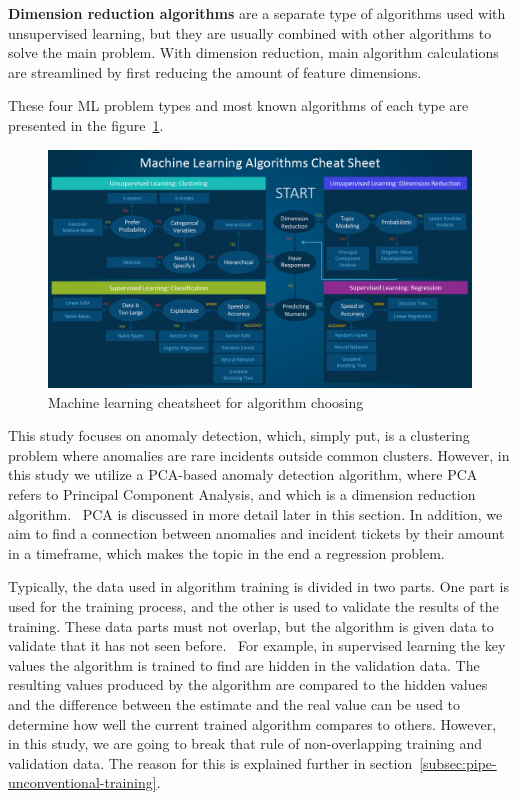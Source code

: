 \textbf{Dimension reduction algorithms} are a separate type of algorithms used with unsupervised learning,
but they are usually combined with other algorithms
to solve the main problem.
With dimension reduction,
main algorithm calculations are streamlined by first reducing the amount of feature dimensions.~\cite{li2017mlalgorithm}

These four ML problem types
and most known algorithms of each type
are presented in the figure~\ref{fig:ml-algorithm-cheatsheet}.


\begin{figure}[htb]
    \centering
    \includegraphics[width=150mm]{./appendices/machine-learning-cheet-sheet-2}
    \caption{Machine learning cheatsheet for algorithm choosing\cite{li2017mlalgorithm}
    \label{fig:ml-algorithm-cheatsheet}}
\end{figure}

This study focuses on anomaly detection,
which, simply put, is a clustering problem
where anomalies are rare incidents outside common clusters.
However,
in this study we utilize a PCA-based anomaly detection algorithm,
where PCA refers to Principal Component Analysis,
and which is a dimension reduction algorithm.~\cite{li2017mlalgorithm}
PCA is discussed in more detail later in this section.
In addition,
we aim to find a connection between anomalies and incident tickets
by their amount in a timeframe,
which makes the topic in the end a regression problem.

Typically,
the data used in algorithm training
is divided in two parts.
One part is used for the training process,
and the other is used to validate the results of the training.
These data parts must not overlap,
but the algorithm is given data to validate
that it has not seen before.~\cite{baheti2022datasplit}
For example,
in supervised learning
the key values the algorithm is trained to find
are hidden in the validation data.
The resulting values produced by the algorithm
are compared to the hidden values
and the difference between the estimate and the real value
can be used to determine how well the current trained algorithm compares to others.
However, in this study,
we are going to break that rule
of non-overlapping training and validation data.
The reason for this is explained further in section~\ref{subsec:pipe-unconventional-training}.

